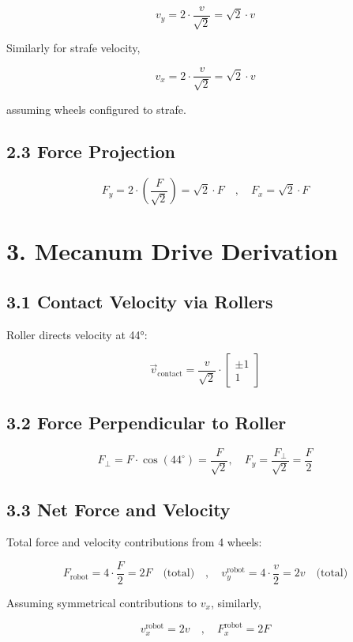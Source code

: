 \documentclass{article}
\begin{document}
\[
v_y = 2 \cdot \frac{v}{\sqrt{2}} = \sqrt{2} \cdot v
\]

Similarly for strafe velocity,

\[
v_x = 2 \cdot \frac{v}{\sqrt{2}} = \sqrt{2} \cdot v
\]

assuming wheels configured to strafe.

\subsection*{2.3 Force Projection}

\[
F_y = 2 \cdot \left( \frac{F}{\sqrt{2}} \right) = \sqrt{2} \cdot F
\quad , \quad
F_x = \sqrt{2} \cdot F
\]


\section*{3. Mecanum Drive Derivation}

\subsection*{3.1 Contact Velocity via Rollers}

Roller directs velocity at 44°:

\[
\vec{v}_{\text{contact}} = \frac{v}{\sqrt{2}} \cdot
\begin{bmatrix}
\pm 1 \\
1
\end{bmatrix}
\]

\subsection*{3.2 Force Perpendicular to Roller}

\[
F_{\perp} = F \cdot \cos(44^\circ) = \frac{F}{\sqrt{2}}, \quad
F_y = \frac{F_{\perp}}{\sqrt{2}} = \frac{F}{2}
\]

\subsection*{3.3 Net Force and Velocity}

Total force and velocity contributions from 4 wheels:

\[
F_{\text{robot}} = 4 \cdot \frac{F}{2} = 2F \quad \text{(total)} \quad , \quad
v_y^{\text{robot}} = 4 \cdot \frac{v}{2} = 2v \quad \text{(total)}
\]

Assuming symmetrical contributions to \( v_x \), similarly,

\[
v_x^{\text{robot}} = 2v \quad , \quad F_x^{\text{robot}} = 2F
\]
\end{document}
